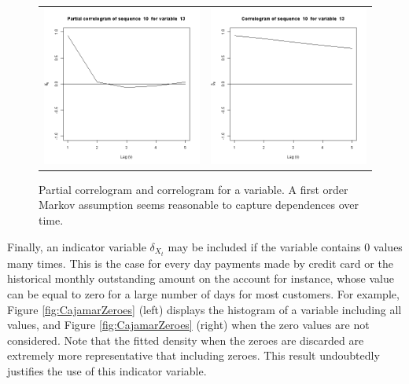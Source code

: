 \begin{figure}[htbp]
  \centering
   \begin{tabular}{cc}    
       \includegraphics[width=70mm]{figures/CajamarPartialCorrelogram} &
        \includegraphics[width=70mm]{figures/CajamarCorrelogram}
    \end{tabular}
     \caption{\label{fig:CajamarCorrelogramsAndPartial} Partial correlogram and correlogram for a variable. A first order Markov assumption seems reasonable to capture dependences over time.}
\end{figure}


Finally, an indicator variable $\delta_{X_t}$ may be included if the variable contains 0 values many times. This is the case for every day payments made by credit card or the historical monthly outstanding amount on the account for instance, whose value can be equal to zero for a large number of days for most customers. For example, Figure \ref{fig:CajamarZeroes} (left) displays the histogram of a variable including all values, and Figure \ref{fig:CajamarZeroes} (right) when the zero values are not considered. Note that the fitted density when the zeroes are discarded are extremely more representative that including zeroes. This result undoubtedly justifies the use of this indicator variable.

